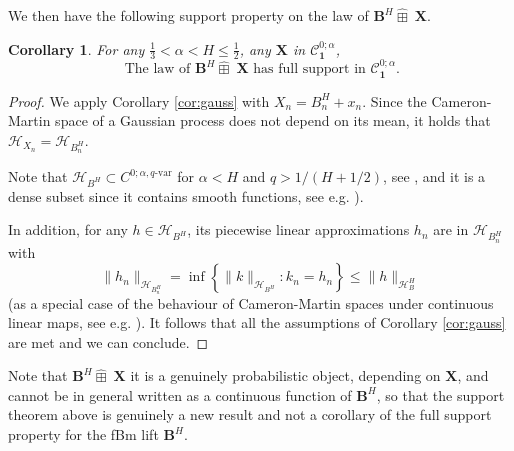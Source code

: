 \documentclass[12pt,a4paper]{article}
\numberwithin{equation}{section}
\newcommand\paul[1]{\textcolor{red}{{(paul) #1}}}
\def\cH{\mathcal{H}}\def\cI{\mathcal{I}}
\def\fx{\mathbf{x}}
\def\fX{\mathbf{X}}
\def\fB{\mathbf{B}}
\theoremstyle{plain}
\newtheorem{corollary}[theorem]{Corollary}
\theoremstyle{definition}
\theoremstyle{remark}
\begin{document}
We then have the following support property on the law of $\fB^H \widehat\boxplus \; \fX$. 

\begin{corollary}
For any $\frac 1 3 < \alpha < H \leq \frac 1 2$, any $\fX$ in $\mathcal{C}^{0;\alpha}_{\mathbf{1}}$, 
\[
\mbox{ The law of }\fB^{H} \widehat\boxplus\;  \fX \mbox{ has full support in } \mathcal{C}^{0;\alpha}_{\mathbf{1}}.
\]%
\end{corollary}
\begin{proof}
We apply Corollary \ref{cor:gauss} with $X_n =  B^H_n + x_n$. Since the Cameron-Martin space of a Gaussian process does not depend on its mean, it holds that $\cH_{X_n} = \cH_{B^H_n}$.

Note that $\cH_{B^{H}} \subset C^{0;\alpha,q\text{-var}}$ for $\alpha < H$ and $q > 1/(H+1/2)$, see \cite{FV06embedding}, and it is a dense subset since it contains smooth functions, see e.g. \cite[Section 5.2]{Pic10}). %

In addition, for any $h \in \cH_{B^H}$, its piecewise linear approximations $h_n$ are in $ \cH_{B^H_n}$ with 
\[\|h_n\|_{ \cH_{B^H_n}} = \inf \left\{ \|k \|_{\cH_{B^H}}: k_n = h_n \right\} \leq \|h\|_{\cH_B^H}\]
(as a special case of the behaviour of Cameron-Martin spaces under continuous linear maps, see e.g. \cite[Proposition 3.71]{Hai09}).  It follows that all the assumptions of Corollary \ref{cor:gauss} are met and we can conclude.
\end{proof}

Note that $\fB^{H}\widehat \boxplus \; \fX$ it is a genuinely probabilistic object, depending on $\fX$, and cannot be in general written as a continuous function of $\fB^H$, so that the support theorem above is genuinely a new result and not a corollary of the full support property for the fBm lift $\fB^H$.

%
%
%






\end{document}
